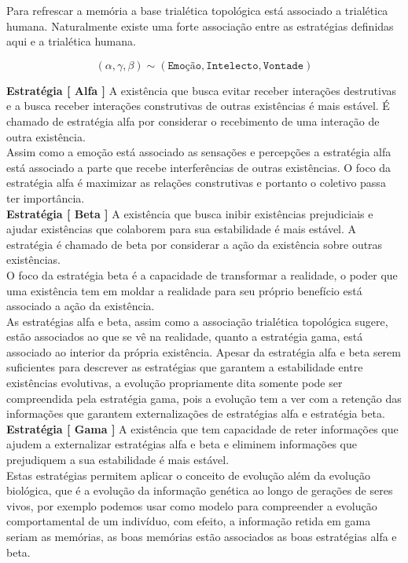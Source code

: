\documentclass[10pt,a4paper]{report}
\begin{document}
Para refrescar a memória a base trialética topológica está associado a trialética humana. Naturalmente existe uma forte associação entre as estratégias definidas aqui e a trialética humana.

$$(\alpha, \gamma, \beta) \sim (\texttt{Emoção}, \texttt{Intelecto}, \texttt{Vontade}) $$

\textbf{Estratégia [ Alfa ]} A existência que busca evitar receber interações destrutivas e a busca receber interações construtivas de outras existências é mais estável. É chamado de estratégia alfa por considerar o recebimento de uma interação de outra existência. \\

Assim como a emoção está associado as sensações e percepções a estratégia alfa está associado a parte que recebe interferências de outras existências. O foco da estratégia alfa é maximizar as relações construtivas e portanto o coletivo passa ter importância. \\

\textbf{Estratégia [ Beta ]} A existência que busca inibir existências prejudiciais e ajudar existências que colaborem para sua estabilidade é mais estável. A estratégia é chamado de beta por considerar a ação da existência sobre outras existências. \\

O foco da estratégia beta é a capacidade de transformar a realidade, o poder que uma existência tem em moldar a realidade para seu próprio benefício está associado a ação da existência. \\

As estratégias alfa e beta, assim como a associação trialética topológica sugere, estão associados ao que se vê na realidade, quanto a estratégia gama, está associado ao interior da própria existência. Apesar da estratégia alfa e beta serem suficientes para descrever as estratégias que garantem a estabilidade entre existências evolutivas, a evolução propriamente dita somente pode ser compreendida pela estratégia gama, pois a evolução tem a ver com a retenção das informações que garantem externalizações de estratégias alfa e estratégia beta.\\

\textbf{Estratégia [ Gama ]} A existência que tem capacidade de reter informações que ajudem a externalizar estratégias alfa e beta e eliminem informações que prejudiquem a sua estabilidade é mais estável.\\

Estas estratégias permitem aplicar o conceito de evolução além da evolução biológica, que é a evolução da informação genética ao longo de gerações de seres vivos, por exemplo podemos usar como modelo para compreender a evolução comportamental de um indivíduo, com efeito, a informação retida em gama seriam as memórias, as boas memórias estão associados as boas estratégias alfa e beta.
\end{document}
